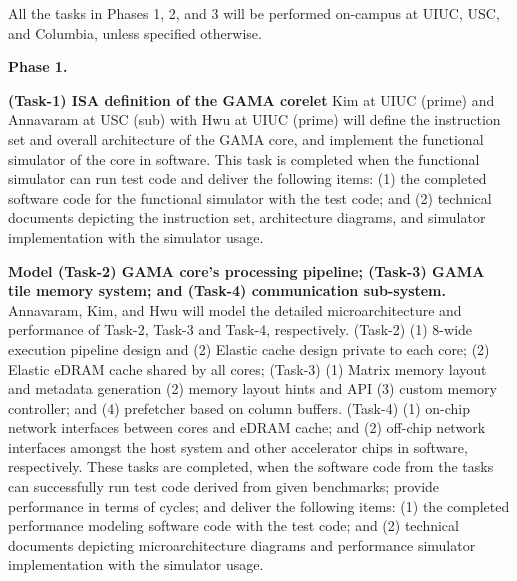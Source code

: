 \noindent
All the tasks in Phases 1, 2, and 3 will be performed on-campus at UIUC, USC, and Columbia, unless specified otherwise.

\noindent
\textbf{Phase 1.}

\noindent
\textbf{(Task-1) ISA definition of the GAMA corelet} 
Kim at UIUC (prime) and Annavaram at USC (sub) with Hwu at UIUC (prime) will define the instruction set and overall architecture of the GAMA core, and implement the functional simulator of the core in software.
This task is completed when the functional simulator can run test code and deliver the following items: 
(1) the completed software code for the functional simulator with the test code; and (2) technical documents depicting the instruction set, architecture diagrams, and simulator implementation with the simulator usage.


\vspace{3pt}
\noindent
\textbf{Model (Task-2) GAMA core's processing pipeline; (Task-3) GAMA tile memory system; and (Task-4) communication sub-system.}
Annavaram, Kim, and Hwu will model the detailed microarchitecture and performance of Task-2, Task-3 and Task-4, respectively.  
(Task-2) (1) 8-wide execution pipeline design and (2) Elastic cache design private to each core; (2) Elastic eDRAM cache shared by all cores; 
(Task-3) (1) Matrix memory layout and metadata generation (2) memory layout hints and API (3) custom memory controller; and (4)  prefetcher based on column buffers.
(Task-4) (1) on-chip network interfaces between cores and eDRAM cache; and (2) off-chip network interfaces amongst the host system and other accelerator chips in software, respectively.
These tasks are completed, when the software code from the tasks can successfully run test code derived from given benchmarks; provide performance in terms of cycles; and deliver the following items:
(1) the completed performance modeling software code with the test code; and (2) technical documents depicting microarchitecture diagrams and performance simulator implementation with the simulator usage.


